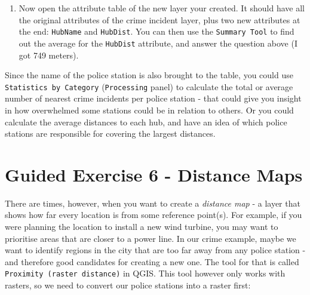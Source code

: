 \documentclass[
  letterpaper,
  DIV=11,
  numbers=noendperiod]{scrreprt}
\providecommand{\tightlist}{%
  \setlength{\itemsep}{0pt}\setlength{\parskip}{0pt}}\usepackage{longtable,booktabs,array}
\begin{document}
\begin{enumerate}
\def\labelenumi{(\arabic{enumi})}
\setcounter{enumi}{353}
\tightlist
\item
  Now open the attribute table of the new layer your created. It should
  have all the original attributes of the crime incident layer, plus two
  new attributes at the end: \texttt{HubName} and \texttt{HubDist}. You
  can then use the \texttt{Summary\ Tool} to find out the average for
  the \texttt{HubDist} attribute, and answer the question above (I got
  749 meters).
\end{enumerate}

\begin{tcolorbox}[enhanced jigsaw, breakable, toptitle=1mm, colback=white, left=2mm, leftrule=.75mm, titlerule=0mm, colframe=quarto-callout-tip-color-frame, opacityback=0, title=\textcolor{quarto-callout-tip-color}{\faLightbulb}\hspace{0.5em}{Tip}, toprule=.15mm, opacitybacktitle=0.6, bottomtitle=1mm, colbacktitle=quarto-callout-tip-color!10!white, bottomrule=.15mm, coltitle=black, rightrule=.15mm, arc=.35mm]

Since the name of the police station is also brought to the table, you
could use \texttt{Statistics\ by\ Category} (\texttt{Processing} panel)
to calculate the total or average number of nearest crime incidents per
police station - that could give you insight in how overwhelmed some
stations could be in relation to others. Or you could calculate the
average distances to each hub, and have an idea of which police stations
are responsible for covering the largest distances.

\end{tcolorbox}

\section{Guided Exercise 6 - Distance
Maps}\label{guided-exercise-6---distance-maps}

There are times, however, when you want to create a \emph{distance map}
- a layer that shows how far every location is from some reference
point(s). For example, if you were planning the location to install a
new wind turbine, you may want to prioritise areas that are closer to a
power line. In our crime example, maybe we want to identify regions in
the city that are too far away from any police station - and therefore
good candidates for creating a new one. The tool for that is called
\texttt{Proximity\ (raster\ distance)} in QGIS. This tool however only
works with rasters, so we need to convert our police stations into a
raster first:
\end{document}
